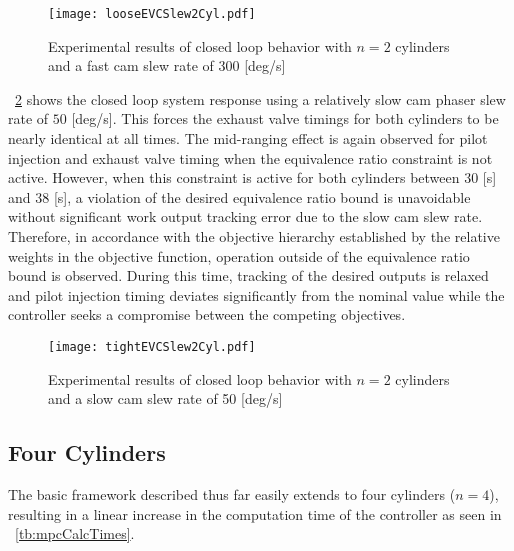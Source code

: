 \begin{figure}
\centering
\texttt{[image: looseEVCSlew2Cyl.pdf]}
\caption{Experimental results of closed loop behavior with $n=2$ cylinders and a fast cam slew rate of 300 [deg/s]}
\label{fig:looseEVCSlew2Cyl}
\end{figure}

\figurename~\ref{fig:tightEVCSlew2Cyl} shows the closed loop system response using a relatively slow cam phaser slew rate of $50$ [deg/s]. This forces the exhaust valve timings for both cylinders to be nearly identical at all times. The mid-ranging effect is again observed for pilot injection and exhaust valve timing when the equivalence ratio constraint is not active. However, when this constraint is active for both cylinders between $30$ [s] and $38$ [s], a violation of the desired equivalence ratio bound is unavoidable without significant work output tracking error due to the slow cam slew rate. Therefore, in accordance with the objective hierarchy established by the relative weights in the objective function, operation outside of the equivalence ratio bound is observed. During this time, tracking of the desired outputs is relaxed and pilot injection timing deviates significantly from the nominal value while the controller seeks a compromise between the competing objectives.

\begin{figure}
\centering
\texttt{[image: tightEVCSlew2Cyl.pdf]}
\caption{Experimental results of closed loop behavior with $n=2$ cylinders and a slow cam slew rate of 50 [deg/s]}
\label{fig:tightEVCSlew2Cyl}
\end{figure}

\subsection{Four Cylinders}
The basic framework described thus far easily extends to four cylinders ($n=4$), resulting in a linear increase in the computation time of the controller as seen in \tablename~\ref{tb:mpcCalcTimes}.

